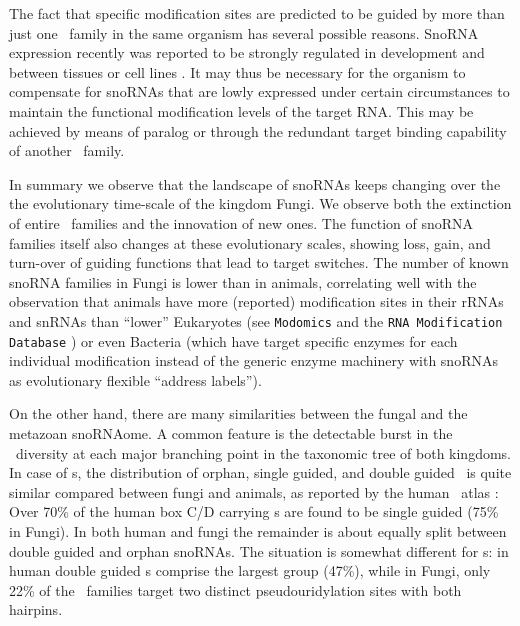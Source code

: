 The fact that specific modification sites are predicted to be guided
by more than just one \sno\ family in the same organism has several
possible reasons. SnoRNA expression recently was reported to be
strongly regulated in development and between tissues or cell lines
\cite{Kapushesky:2012, Jorjani:2016}. It may thus be necessary for the
organism to compensate for snoRNAs that are lowly expressed under
certain circumstances to maintain the functional modification levels
of the target RNA. This may be achieved by means of paralog or through
the redundant target binding capability of another \sno\ family.

In summary we observe that the landscape of snoRNAs keeps changing
over the the evolutionary time-scale of the kingdom Fungi. We observe
both the extinction of entire \sno\ families and the innovation of new
ones. The function of snoRNA families itself also changes at these
evolutionary scales, showing loss, gain, and turn-over of guiding
functions that lead to target switches. The number of known snoRNA
families in Fungi is lower than in animals, correlating well with the
observation that animals have more (reported) modification sites in
their rRNAs and snRNAs than ``lower'' Eukaryotes (see
\texttt{Modomics} and the \texttt{RNA Modification Database}
\cite{Machnicka:2013, Cantara:2011}) or even Bacteria (which have
target specific enzymes for each individual modification instead of
the generic enzyme machinery with snoRNAs as evolutionary flexible
``address labels'').

On the other hand, there are many similarities between the fungal and
the metazoan snoRNAome.  A common feature is the detectable burst in
the \sno\ diversity at each major branching point in the taxonomic
tree of both kingdoms.  In case of \cd s, the distribution of orphan,
single guided, and double guided \snos\ is quite similar compared
between fungi and animals, as reported by the human \sno\ atlas
\citep{Jorjani:2016}: Over 70\% of the human box C/D carrying \sno s
are found to be single guided (75\% in Fungi).  In both human and
fungi the remainder is about equally split between double guided and
orphan snoRNAs. The situation is somewhat different for \haca s: in
human double guided \sno s comprise the largest group (47\%), while in
Fungi, only 22\% of the \haca\ families target two distinct
pseudouridylation sites with both hairpins.

